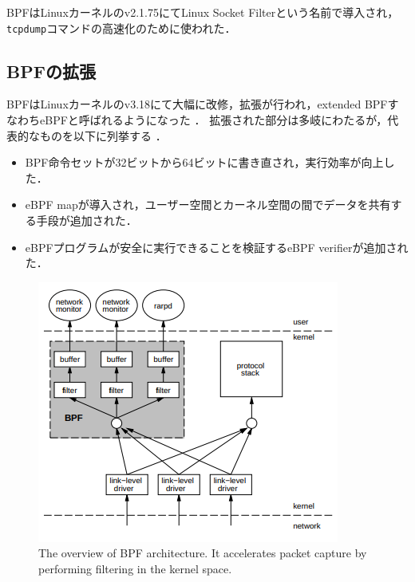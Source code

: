 BPFはLinuxカーネルのv2.1.75にてLinux Socket Filterという名前で導入され，\texttt{tcpdump}コマンドの高速化のために使われた．

\subsection{BPFの拡張}
BPFはLinuxカーネルのv3.18にて大幅に改修，拡張が行われ，extended BPFすなわちeBPFと呼ばれるようになった \cite{Linux31836:online}．
拡張された部分は多岐にわたるが，代表的なものを以下に列挙する \cite{learning-ebpf}．
\begin{itemize}
  \item BPF命令セットが32ビットから64ビットに書き直され，実行効率が向上した．
  \item eBPF mapが導入され，ユーザー空間とカーネル空間の間でデータを共有する手段が追加された．
  \item eBPFプログラムが安全に実行できることを検証するeBPF verifierが追加された．
\end{itemize}
\begin{figure}[tp]
  \begin{center}
    \includegraphics[width=\columnwidth]{./img/bpf_overview.png}
  \end{center}
  \caption{The overview of BPF architecture. It accelerates packet capture
    by performing filtering in the kernel space. \cite{mccanne1993bsd}}
  \label{img:bpf_old}
\end{figure}


